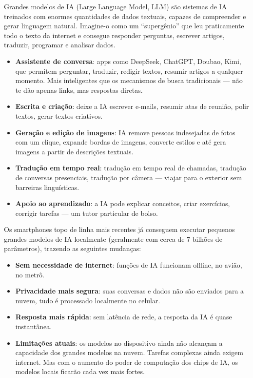 
Grandes modelos de IA (Large Language Model, LLM) são sistemas de IA treinados com enormes quantidades de dados textuais, capazes de compreender e gerar linguagem natural. Imagine-o como um “supergênio” que leu praticamente todo o texto da internet e consegue responder perguntas, escrever artigos, traduzir, programar e analisar dados.


\begin{itemize}
  \item \textbf{Assistente de conversa}: apps como DeepSeek, ChatGPT, Doubao, Kimi, que permitem perguntar, traduzir, redigir textos, resumir artigos a qualquer momento. Mais inteligentes que os mecanismos de busca tradicionais — não te dão apenas links, mas respostas diretas.
  \item \textbf{Escrita e criação}: deixe a IA escrever e-mails, resumir atas de reunião, polir textos, gerar textos criativos.
  \item \textbf{Geração e edição de imagens}: IA remove pessoas indesejadas de fotos com um clique, expande bordas de imagens, converte estilos e até gera imagens a partir de descrições textuais.
  \item \textbf{Tradução em tempo real}: tradução em tempo real de chamadas, tradução de conversas presenciais, tradução por câmera — viajar para o exterior sem barreiras linguísticas.
  \item \textbf{Apoio ao aprendizado}: a IA pode explicar conceitos, criar exercícios, corrigir tarefas — um tutor particular de bolso.
\end{itemize}


Os smartphones topo de linha mais recentes já conseguem executar pequenos grandes modelos de IA localmente (geralmente com cerca de 7 bilhões de parâmetros), trazendo as seguintes mudanças:

\begin{itemize}
  \item \textbf{Sem necessidade de internet}: funções de IA funcionam offline, no avião, no metrô.
  \item \textbf{Privacidade mais segura}: suas conversas e dados não são enviados para a nuvem, tudo é processado localmente no celular.
  \item \textbf{Resposta mais rápida}: sem latência de rede, a resposta da IA é quase instantânea.
  \item \textbf{Limitações atuais}: os modelos no dispositivo ainda não alcançam a capacidade dos grandes modelos na nuvem. Tarefas complexas ainda exigem internet. Mas com o aumento do poder de computação dos chips de IA, os modelos locais ficarão cada vez mais fortes.
\end{itemize}

